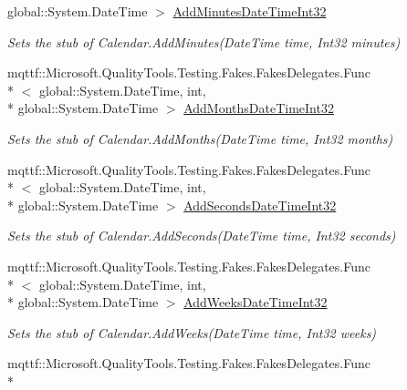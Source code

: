 \begin{DoxyCompactItemize}
global\-::\-System.\-Date\-Time $>$ \hyperlink{class_system_1_1_globalization_1_1_fakes_1_1_stub_calendar_ad79f3c53a87fbc9a67a517bd2af94518}{Add\-Minutes\-Date\-Time\-Int32}
\begin{DoxyCompactList}\small\item\em Sets the stub of Calendar.\-Add\-Minutes(\-Date\-Time time, Int32 minutes)\end{DoxyCompactList}\item 
mqttf\-::\-Microsoft.\-Quality\-Tools.\-Testing.\-Fakes.\-Fakes\-Delegates.\-Func\\*
$<$ global\-::\-System.\-Date\-Time, int, \\*
global\-::\-System.\-Date\-Time $>$ \hyperlink{class_system_1_1_globalization_1_1_fakes_1_1_stub_calendar_ac65b46a63336df46bb26e0c6269972f6}{Add\-Months\-Date\-Time\-Int32}
\begin{DoxyCompactList}\small\item\em Sets the stub of Calendar.\-Add\-Months(\-Date\-Time time, Int32 months)\end{DoxyCompactList}\item 
mqttf\-::\-Microsoft.\-Quality\-Tools.\-Testing.\-Fakes.\-Fakes\-Delegates.\-Func\\*
$<$ global\-::\-System.\-Date\-Time, int, \\*
global\-::\-System.\-Date\-Time $>$ \hyperlink{class_system_1_1_globalization_1_1_fakes_1_1_stub_calendar_a37ec1885128ab99c9da88e0bad2ece23}{Add\-Seconds\-Date\-Time\-Int32}
\begin{DoxyCompactList}\small\item\em Sets the stub of Calendar.\-Add\-Seconds(\-Date\-Time time, Int32 seconds)\end{DoxyCompactList}\item 
mqttf\-::\-Microsoft.\-Quality\-Tools.\-Testing.\-Fakes.\-Fakes\-Delegates.\-Func\\*
$<$ global\-::\-System.\-Date\-Time, int, \\*
global\-::\-System.\-Date\-Time $>$ \hyperlink{class_system_1_1_globalization_1_1_fakes_1_1_stub_calendar_a9c917e3039c6ab15f63ee0f253ef3377}{Add\-Weeks\-Date\-Time\-Int32}
\begin{DoxyCompactList}\small\item\em Sets the stub of Calendar.\-Add\-Weeks(\-Date\-Time time, Int32 weeks)\end{DoxyCompactList}\item 
mqttf\-::\-Microsoft.\-Quality\-Tools.\-Testing.\-Fakes.\-Fakes\-Delegates.\-Func\\*

\end{DoxyCompactItemize}
